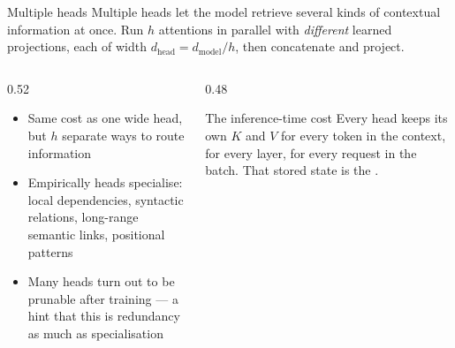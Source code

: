 \documentclass[aspectratio=169,10pt]{beamer}
\begin{document}
\begin{frame}{Multiple heads}
  Multiple heads let the model retrieve several kinds of contextual
  information at once. Run $h$ attentions in parallel with \emph{different}
  learned projections, each of width
  $d_{\text{head}} = d_{\text{model}}/h$, then concatenate and project.
  \vspace{0.5em}
  \begin{columns}[T]
    \begin{column}{0.52\textwidth}
      \begin{itemize}
        \item Same cost as one wide head, but $h$ separate ways to route information
        \item Empirically heads specialise: local dependencies, syntactic
          relations, long-range semantic links, positional patterns
        \item Many heads turn out to be prunable after training --- a hint that
          this is redundancy as much as specialisation
      \end{itemize}
    \end{column}
    \begin{column}{0.48\textwidth}
      \begin{block}{The inference-time cost}
        Every head keeps its own $K$ and $V$ for every token in the context,
        for every layer, for every request in the batch.
        \vspace{0.4em}
        That stored state is the .
      \end{block}
    \end{column}
  \end{columns}
\end{frame}
\end{document}
